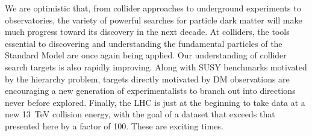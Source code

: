 
We are optimistic that, from collider approaches to underground experiments to observatories, the variety of powerful searches for particle dark matter will make much progress toward its discovery in the next decade.
At colliders, the tools essential to discovering and understanding the fundamental particles of the Standard Model are once again being applied.
Our understanding of collider search targets is also rapidly improving.
Along with SUSY benchmarks motivated by the hierarchy problem, targets directly motivated by DM observations are encouraging a new generation of experimentalists to branch out into directions never before explored.
Finally, the LHC is just at the beginning to take data at a new 13~TeV collision energy, with the goal of a dataset that exceeds that presented here by a factor of 100.
These are exciting times.

















